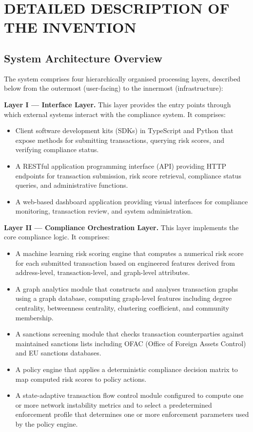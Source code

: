 \documentclass[12pt,a4paper]{article}
\begin{document}
\section{DETAILED DESCRIPTION OF THE INVENTION}

\subsection{System Architecture Overview}

The system comprises four hierarchically organised processing layers, 
described below from the outermost (user-facing) to the innermost 
(infrastructure):

\textbf{Layer I --- Interface Layer.} This layer provides the entry points 
through which external systems interact with the compliance system. It 
comprises:
\begin{itemize}
\item Client software development kits (SDKs) in TypeScript and Python that 
expose methods for submitting transactions, querying risk scores, and 
verifying compliance status.
\item A RESTful application programming interface (API) providing HTTP 
endpoints for transaction submission, risk score retrieval, compliance 
status queries, and administrative functions.
\item A web-based dashboard application providing visual interfaces for 
compliance monitoring, transaction review, and system administration.
\end{itemize}

\textbf{Layer II --- Compliance Orchestration Layer.} This layer implements 
the core compliance logic. It comprises:
\begin{itemize}
\item A machine learning risk scoring engine that computes a numerical risk 
score for each submitted transaction based on engineered features derived 
from address-level, transaction-level, and graph-level attributes.
\item A graph analytics module that constructs and analyses transaction 
graphs using a graph database, computing graph-level features including 
degree centrality, betweenness centrality, clustering coefficient, and 
community membership.
\item A sanctions screening module that checks transaction counterparties 
against maintained sanctions lists including OFAC (Office of Foreign Assets 
Control) and EU sanctions databases.
\item A policy engine that applies a deterministic compliance decision matrix 
to map computed risk scores to policy actions.
\item A state-adaptive transaction flow control module configured to compute 
one or more network instability metrics and to select a predetermined 
enforcement profile that determines one or more enforcement parameters used 
by the policy engine.
\end{itemize}
\end{document}
